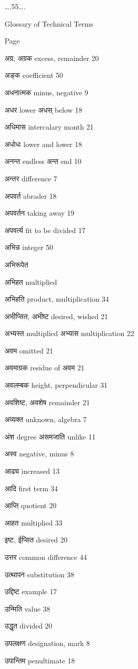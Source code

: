 \documentclass[]{article}
\date{}
\begin{document}
{\ldots{}.55\ldots{}.}

{Glossary of Technical Terms}

{ }

{ Page}

{अग्र, अग्रक excess, remainder 20}

{अङ्क coefficient 50}

{अधनात्मक minus, negative 9}

{अधर lower अधस् below 18}

{अधिमास intercalary month 21}

{अधोधः lower and lower 18}

{अनन्त endless अन्त end 10}

{अन्तर difference 7}

{अपवर्त abrader 18 }

{अपवर्तन taking away 19}

{अपवर्त्य fit to be divided 17}

{अभिन्न integer 50}

{अभिरूपेत }

{अभिहत multiplied}

{अभिहति product, multiplication 34}

{अभीप्सित, अभीष्ट desired, wished 21}

{अभ्यस्त multiplied अभ्यास multiplication 22}

{अवम omitted 21}

{अवमाग्रक residue of अवम 21}

{अवलम्बक height, perpendicular 31}

{अवशिष्ट, अवशेष remainder 21}

{अव्यक्त unknown, algebra 7}

{अंश degree असमजाति unlike 11}

{अस्व negative, minus 8}

{आढ्य increased 13}

{आदि first term 34}

{आप्ति quotient 20}

{आहत multiplied 33}

{इष्ट, ईप्सित desired 20}

{उत्तर common difference 44}

{उत्थापन substitution 38}

{उद्दिष्ट example 17}

{उन्मिति value 38}

{उद्धृत divided 20}

{उपलक्षण designation, mark 8}

{उपान्तिम penultimate 18}
\end{document}
